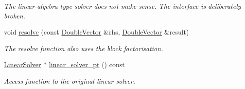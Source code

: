 \begin{DoxyCompactItemize}
\begin{DoxyCompactList}\small\item\em The linear-\/algebra-\/type solver does not make sense. The interface is deliberately broken. \end{DoxyCompactList}\item 
void \hyperlink{classoomph_1_1AugmentedBlockPitchForkLinearSolver_a1d617896a3f1c1b1236ff18dc87ed8d7}{resolve} (const \hyperlink{classoomph_1_1DoubleVector}{Double\+Vector} \&rhs, \hyperlink{classoomph_1_1DoubleVector}{Double\+Vector} \&result)
\begin{DoxyCompactList}\small\item\em The resolve function also uses the block factorisation. \end{DoxyCompactList}\item 
\hyperlink{classoomph_1_1LinearSolver}{Linear\+Solver} $\ast$ \hyperlink{classoomph_1_1AugmentedBlockPitchForkLinearSolver_a96ac14c60f20314f5be075a68a620b3f}{linear\+\_\+solver\+\_\+pt} () const
\begin{DoxyCompactList}\small\item\em Access function to the original linear solver. \end{DoxyCompactList}\end{DoxyCompactItemize}
